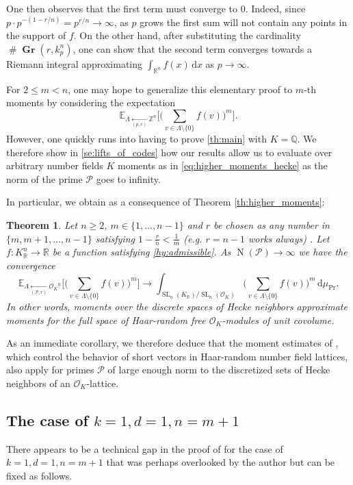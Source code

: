 \documentclass{amsart}
\newtheorem{theorem}{Theorem}
\theoremstyle{definition}
\theoremstyle{remark}
\newcommand{\OK}{\mathcal{O}_K}
\newcommand{\KR}{K_\mathbb{R}}
\newcommand{\diff}{\,\mathrm{d}}
\newcommand{\hecke}[2]{ \underset{( #1, #2 )}{\leftarrow} }
\DeclareMathOperator{\SL}{SL}
\DeclareMathOperator{\card}{\texttt{\#}}
\DeclareMathOperator{\N}{N}
\DeclareMathOperator{\Gr}{\mathbf{Gr}}
\begin{document}
One then observes that the first term must converge to $0$. Indeed, since $p \cdot p^{-(1-r/n)} = p^{r/n} \rightarrow \infty$, as $p$ grows the first sum will not contain any points in the support of $f$. On the other hand, after substituting the cardinality $\card \Gr(r,k_{p}^{n})$, one can show that the second term converges towards a Riemann integral approximating $\int_{\mathbb{R}^{n}}f(x) \diff x$ as $p \rightarrow  \infty$.

For $2\leq m < n$, one may hope to generalize this elementary proof to $m$-th moments by considering the expectation
\begin{equation}
    \label{eq:higher_moments_hecke}
    \mathbb{E}_{\Lambda \hecke{p}{r}  {\mathbb{Z}^{n}}} \Big[ \Big( \sum_{v \in \Lambda \setminus \{0\}}  f(v) \Big)^{m}\Big].
\end{equation}
However, one quickly runs into having to prove \cref{th:main} with $K = \mathbb{Q}$. 
We therefore show in \cref{se:lifts_of_codes} how our results allow us to evaluate over arbitrary number fields $K$  moments as in \cref{eq:higher_moments_hecke} as the norm of the prime $\mathcal{P}$ goes to infinity. { In particular, we obtain as a consequence of Theorem \ref{th:higher_moments}: 
\begin{theorem}\label{thm:mainapplication}
Let $n \ge 2$, $m \in \{1,\dots,n-1\}$ and $r$ be chosen as any number in $\{m,m+1,\dots,n-1\}$ satisfying $1-\frac{r}{n} < \frac{1}{m}$
(e.g. $r=n-1$ works always)
. Let $f:K_{\mathbb{R}}^{n} \rightarrow \mathbb{R}$ be a function satisfying \cref{hy:admissible}. 
As $\N(\mathcal{P}) \rightarrow \infty$ we have the convergence 
{\small \begin{equation}
\mathbb{E}_{\Lambda \hecke{\mathcal{P}}{r}  {{\OK}^{n}}} \Big[ \Big( \sum_{v \in \Lambda \setminus \{0\}}  f(v) \Big)^{m}\Big]\to \int_{\SL_n(\KR)/\SL_n(\OK)}\Big( \sum_{v \in \Lambda \setminus \{0\}}  f(v) \Big)^{m}\diff \mu_{\Pr}.
\end{equation}}
In other words, moments over the discrete spaces of Hecke neighbors approximate moments for the full space of Haar-random free $\OK$-modules of unit covolume. 
\end{theorem}
As an immediate corollary, we therefore deduce that the moment estimates of \cite{GSV23}, which control the behavior of short vectors in Haar-random number field lattices, also apply for primes $\mathcal{P}$ of large enough norm to the discretized sets of Hecke neighbors of an $\OK$-lattice. }

\subsection{The case of \texorpdfstring{$k=1,d=1,n=m+1$}{k=1,d=1,n=m+1}}
\label{ss:log_term}
There appears to be a technical gap in the proof of \cite{K1994} for the case of $k=1,d=1,n=m+1$ that was perhaps overlooked by the author but can be fixed as follows.  
\end{document}
